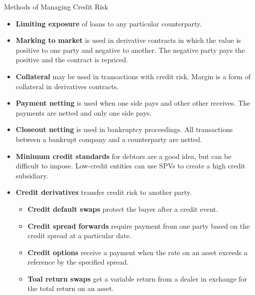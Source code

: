 \documentclass[../custom]{flashcards}
\newcommand{\studyArea}{Risk Management}
\begin{document}
\begin{flashcard}[\studyArea]{Methods of Managing Credit Risk}
    \begin{itemize}[itemsep=1pt,parsep=1pt]
        \item \textbf{Limiting exposure} of loans to any particular counterparty.
        \item \textbf{Marking to market} is used in derivative contracts in which the value is positive to one party and negative to another. The negative party pays the positive and the contract is repriced.
        \item \textbf{Collateral} may be used in transactions with credit risk. Margin is a form of collateral in derivatives contracts.
        \item \textbf{Payment netting} is used when one side pays and other other receives. The payments are netted and only one side pays.
        \item \textbf{Closeout netting} is used in bankruptcy proceedings. All transactions between a bankrupt company and a counterparty are netted.
        \item \textbf{Minimum credit standards} for debtors are a good idea, but can be difficult to impose. Low-credit entities can use SPVs to create a high credit subsidiary.
        \item \textbf{Credit derivatives} transfer credit risk to another party.
        \begin{itemize}
            \item \textbf{Credit default swaps} protect the buyer after a credit event.
            \item \textbf{Credit spread forwards} require payment from one party based on the credit spread at a particular date. 
            \item \textbf{Credit options} receive a payment when the rate on an asset exceeds a reference by the specified spread.
            \item \textbf{Toal return swaps} get a variable return from a dealer in exchange for the total return on an asset.
        \end{itemize}
    \end{itemize}
\end{flashcard}
\end{document}
